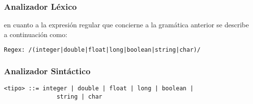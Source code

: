 \subsubsection{Analizador Léxico}

en cuanto a la expresión regular que concierne a la gramática anterior se
describe a continuación como:

\begin{lstlisting}[basicstyle=\footnotesize\ttfamily]
	Regex: /(integer|double|float|long|boolean|string|char)/
\end{lstlisting}


\subsubsection{Analizador Sintáctico}

\begin{lstlisting}[basicstyle=\footnotesize\ttfamily]
	<tipo> ::= integer | double | float | long | boolean |
	           string | char
\end{lstlisting}

